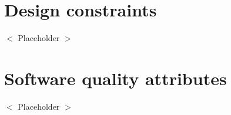 \documentclass{scrreprt}
\theoremstyle{funreq}
\begin{document}
	\section{Design constraints}
	$<$ Placeholder $>$
	
	
	\section{Software quality attributes}
	$<$ Placeholder $>$
	
	
	
	
	
	
	
	
	
\end{document}
